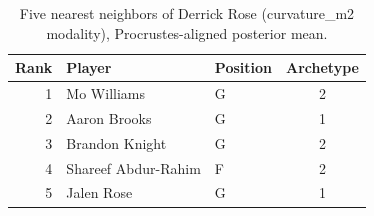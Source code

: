 \begin{table}[htbp]
  \centering\small
  \begin{tabular}{rllc}
    \toprule
    Rank & Player & Position & Archetype \\
    \midrule
    1 & Mo Williams & G & 2 \\
    2 & Aaron Brooks & G & 1 \\
    3 & Brandon Knight & G & 2 \\
    4 & Shareef Abdur-Rahim & F & 2 \\
    5 & Jalen Rose & G & 1 \\
    \bottomrule
  \end{tabular}
  \caption{Five nearest neighbors of Derrick Rose (curvature_m2 modality), Procrustes-aligned posterior mean.}
  \label{tab:Derrick_Rose_neighbors_curvature_m2}
\end{table}

